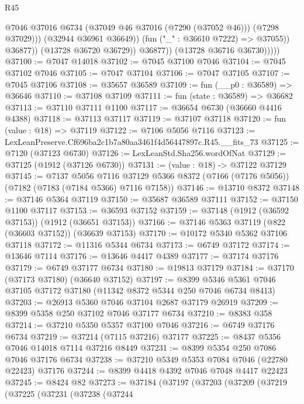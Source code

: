 \begin{lexlean}{R45}
\begin{coremodule}
{                              @7046
                              @37016
                              @6734
                              (@37049 @46 @37016 (@7290 (@37052 @46)))
                              (@7298 @37029)))
                          (@32944 @36961 @36649))
                        (fun ("_" : @36610 @7222) => @37055))
                      @36877))
                  (@13728 @36720 @36729))
                @36877))
            (@13728 @36716 @36730)))))
@37100 := @7047 @14018
@37102 := @7045 @37100 @7046
@37104 := @7045 @37102 @7046
@37105 := @7047 @37104
@37106 := @7047 @37105
@37107 := @7045 @37106
@37108 := @35657 @36589
@37109 := fun (__p0 : @36589) => @36646
@37110 := @37108 @37109
@37111 := fun (state : @36589) => @36682
@37113 := @37110 @37111 @1100
@37117 := @36654 @6730 (@36660 @4416 @4388)
@37118 := @37113 @37117
@37119 := @37107 @37118
@37120 := fun (value : @18) => @37119
@37122 := @7106 @5056 @7116
@37123 := LexLeanPreserve.Cf696ba2c1b7a80aa3461f4d56447897c.R45.__fits_73
@37125 := @7120 (@37123 @6730)
@37126 := LexLeanStd.Sha256.wordOfNat
@37129 := @37125 (@1912 (@37126 @6730))
@37131 := (value : @18) -> @37122 @37129
@37145 := @7137
    @5056
    @7116
    @37129
    @5366
    @8372
    (@7166 (@7176 @5056))
    (@7182 (@7183 (@7184 @5366) @7116 @7158))
@37146 := @13710 @8372
@37148 := @37146 @5364 @37119
@37150 := @35687 @36589 @37111
@37152 := @37150 @1100 @37117
@37153 := @36593 @37152
@37159 := @37148 (@1912 (@36592 @37153)) (@1912 (@36651 @37153))
@37166 := @37146 @5363 @37119 (@822 (@36603 @37152)) (@36639 @37153)
@37170 := @10172 @5340 @5362 @37106 @37118
@37172 := @11316 @5344 @6734
@37173 := @6749 @37172
@37174 := @13646 @7114
@37176 := @13646 @4417 @4389
@37177 := @37174 @37176
@37179 := @6749 @37177 @6734
@37180 := @19813 @37179
@37184 := @37170 (@37173 @37180) (@36640 @37152)
@37197 := @8399 @5346 @5361 @7046 @37105 @37172 @37180 (@11342 @8372 @5344 @250 @7046 @6734 @8413)
@37203 := @26913 @5360 @7046 @37104 @2687 @37179 @26919
@37209 := @8399 @5358 @250 @37102 @7046 @37177 @6734
@37210 := @8383 @358
@37214 := @37210 @5350 @5357 @37100 @7046
@37216 := @6749 @37176 @6734
@37219 := @37214 (@7115 @37216) @37177
@37225 := @8437 @5356 @7046 @14018 @7114 @37216 @8449
@37231 := @8399 @5354 @250 @7086 @7046 @37176 @6734
@37238 := @37210 @5349 @5353 @7084 @7046 (@22780 @22423) @37176
@37244 := @8399 @4418 @4392 @7046 @7048 @4417 @22423
@37245 := @8424 @82
@37273 := @37184
    (@37197
      (@37203
        (@37209
          (@37219
            (@37225
              (@37231
                (@37238
                  (@37244
}
\end{coremodule}
\end{lexlean}
